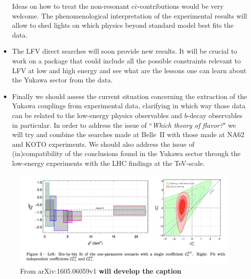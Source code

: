 \begin{itemize}
Ideas on how to treat the non-resonant $c\bar c$-contributions would be very welcome. The phenomenological interpretation of the experimental results will allow to shed lights on which physics beyond standard model best fits the data. 
\item The LFV direct searches will soon provide new results. It will be crucial to work on a package that could include all the possible constraints relevant to LFV at low and high energy and see what are the lessons one can learn about the Yukawa sector from the data. 
\item Finally we should assess the current situation concerning the extraction of the Yukawa couplings from experimental data, clarifying in which way those data can be related to the low-energy physics observables and 
$b$-decay observables in particular. In order to address the issue of ``{\it Which theory of flavor?}" we will try and combine the searches made at Belle~II with those made at NA62 and KOTO experiments.  
We should also address the issue of (in)compatibility of the conclusions found in the Yukawa sector through the low-energy experiments with the LHC findings at the TeV-scale. 
\end{itemize} 



\begin{figure}[!htb]
\begin{center}
\includegraphics[width=14cm]{rare_fit.pdf}
\end{center}
\caption{ From arXiv:1605.06059v1 \bf{will develop the caption}}%
\label{figphis}%
\end{figure}



